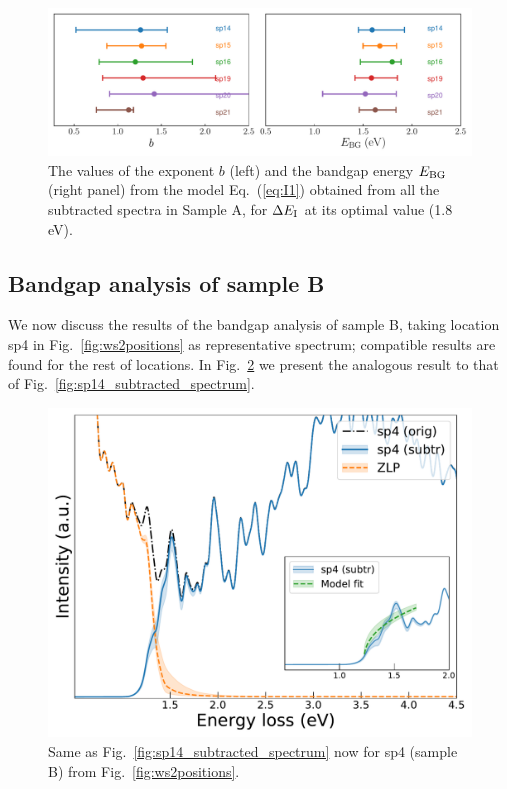 \begin{figure}[H]
\begin{centering}
  \includegraphics[width=0.9\linewidth]{plots/bg_stability.pdf} 
  \caption{The values of the exponent $b$ (left)
    and the bandgap energy $E_{\rm BG}$ (right panel) from the model Eq.~(\ref{eq:I1})
    obtained from all the subtracted spectra in Sample A, 
    for $\Delta E_{\rm I}$ at its optimal value (1.8 eV). 
  }
\label{fig:bgstability}
\end{centering}
\end{figure}


\subsection{Bandgap analysis of sample B}

We now discuss the results of the bandgap analysis of sample B,
taking location sp4 in Fig.~\ref{fig:ws2positions} as representative spectrum; compatible results
are found for the rest of locations.
%
In Fig.~\ref{fig:SubtractedEELS_plot_sp4} we present the analogous
result to that of Fig.~\ref{fig:sp14_subtracted_spectrum}.

\begin{figure}[H]
\begin{centering}
  \includegraphics[width=0.60\linewidth]{plots/SubtractedEELS_plot_sp4.pdf}
  \caption{Same as Fig.~\ref{fig:sp14_subtracted_spectrum}
    now for sp4 (sample B) from Fig.~\ref{fig:ws2positions}.
  }
\label{fig:SubtractedEELS_plot_sp4}
\end{centering}
\end{figure}

